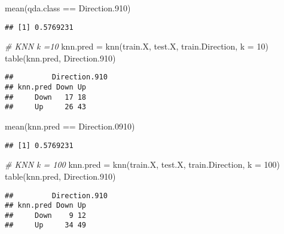 \documentclass[
]{article}
\newenvironment{Shaded}{\begin{snugshade}}{\end{snugshade}}
\newcommand{\AttributeTok}[1]{\textcolor[rgb]{0.77,0.63,0.00}{#1}}
\newcommand{\CommentTok}[1]{\textcolor[rgb]{0.56,0.35,0.01}{\textit{#1}}}
\newcommand{\DecValTok}[1]{\textcolor[rgb]{0.00,0.00,0.81}{#1}}
\newcommand{\FloatTok}[1]{\textcolor[rgb]{0.00,0.00,0.81}{#1}}
\newcommand{\FunctionTok}[1]{\textcolor[rgb]{0.00,0.00,0.00}{#1}}
\newcommand{\NormalTok}[1]{#1}
\newcommand{\OtherTok}[1]{\textcolor[rgb]{0.56,0.35,0.01}{#1}}
\newcommand{\SpecialCharTok}[1]{\textcolor[rgb]{0.00,0.00,0.00}{#1}}
\begin{document}
\begin{Shaded}
\begin{Highlighting}[]
\FunctionTok{mean}\NormalTok{(qda.class }\SpecialCharTok{==}\NormalTok{ Direction}\FloatTok{.910}\NormalTok{)}
\end{Highlighting}
\end{Shaded}

\begin{verbatim}
## [1] 0.5769231
\end{verbatim}

\begin{Shaded}
\begin{Highlighting}[]
\CommentTok{\# KNN k =10}
\NormalTok{knn.pred }\OtherTok{=} \FunctionTok{knn}\NormalTok{(train.X, test.X, train.Direction, }\AttributeTok{k =} \DecValTok{10}\NormalTok{)}
\FunctionTok{table}\NormalTok{(knn.pred, Direction}\FloatTok{.910}\NormalTok{)}
\end{Highlighting}
\end{Shaded}

\begin{verbatim}
##         Direction.910
## knn.pred Down Up
##     Down   17 18
##     Up     26 43
\end{verbatim}

\begin{Shaded}
\begin{Highlighting}[]
\FunctionTok{mean}\NormalTok{(knn.pred }\SpecialCharTok{==}\NormalTok{ Direction}\FloatTok{.0910}\NormalTok{)}
\end{Highlighting}
\end{Shaded}

\begin{verbatim}
## [1] 0.5769231
\end{verbatim}

\begin{Shaded}
\begin{Highlighting}[]
\CommentTok{\# KNN k = 100}
\NormalTok{knn.pred }\OtherTok{=} \FunctionTok{knn}\NormalTok{(train.X, test.X, train.Direction, }\AttributeTok{k =} \DecValTok{100}\NormalTok{)}
\FunctionTok{table}\NormalTok{(knn.pred, Direction}\FloatTok{.910}\NormalTok{)}
\end{Highlighting}
\end{Shaded}

\begin{verbatim}
##         Direction.910
## knn.pred Down Up
##     Down    9 12
##     Up     34 49
\end{verbatim}
\end{document}

